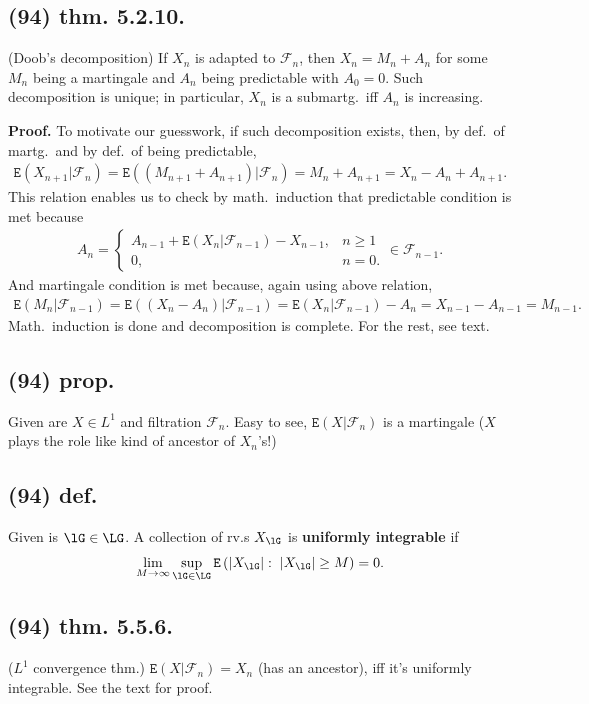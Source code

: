 \documentclass[12pt]{article}
\newcommand{\oo}\infty%
\newcommand{\Rb}[1]{ \left( #1 \right) }%
\newcommand{\SF}[1]{ \mathscr{#1} }%
\newcommand{\Ss}[1]{\textsf{\bfseries{#1}}}%
\newcommand{\Tw}[1]{\texttt{#1}}%
\newcommand{\EqGo}[1]{ \begin{gather*}{#1}\end{gather*} } %
\newcommand{\E}[1]{ \Tw{E}\Rb{#1} }%
\begin{document}
\subsection*{(94) thm. 5.2.10.} (Doob's decomposition) If \(X_n\) is adapted to \(\SF{F}_n\), then \(X_n =M_n +A_n\) for some \(M_n\) being a martingale and \(A_n\) being predictable with \(A_0 =0\). 
Such decomposition is unique; in particular, \(X_n\) is a submartg.\ iff \(A_n\) is increasing. \par
\Ss{Proof.} To motivate our guesswork, if such decomposition exists, then, by def.\ of martg.\ and by def.\ of being predictable, \EqGo{
 \E{X_{n+1} \Big| \SF{F}_n}
 =\E{(M_{n+1} +A_{n+1}) \Big| \SF{F}_n}
 =M_n +A_{n+1}
 =X_n -A_n +A_{n+1}.
} This relation enables us to check by math.\ induction that predictable condition is met because \begin{gather*}
 A_n =\begin{cases} A_{n-1} +\E{X_n \Big| \SF{F}_{n-1}} -X_{n-1}, &n \geq 1 \\ 0, &n =0.
 \end{cases} \in \SF{F}_{n-1}.
\end{gather*} And martingale condition is met because, again using above relation, \EqGo{
 \E{M_n \Big| \SF{F}_{n-1}}
 =\E{(X_n -A_n) \Big| \SF{F}_{n-1}}
 =\E{X_n \Big| \SF{F}_{n-1}} -A_n
 =X_{n-1} -A_{n-1} =M_{n-1}.
} Math.\ induction is done and decomposition is complete. For the rest, see text.

\subsection*{(94) prop.} Given are \(X \in L^1\) and filtration \(\SF{F}_n\). 
Easy to see, \(\E{X \Big| \SF{F}_n}\) is a martingale (\(X\) plays the role like kind of ancestor of \(X_n\)'s!)

\subsection*{(94) def.} Given is \(\lG \in \LG\). A collection of rv.s \(X_\lG\) is \Ss{uniformly integrable} if \EqGo{
 \lim_{M \to \oo} \sup_{\lG \in \LG} \E{|X_\lG|:\; |X_\lG| \geq M} =0.
}

\subsection*{(94) thm. 5.5.6.} (\(L^1\) convergence thm.) \(\E{X \Big| \SF{F}_n} =X_n\) (has an ancestor), iff it's uniformly integrable. 
See the text for proof.
\end{document}
